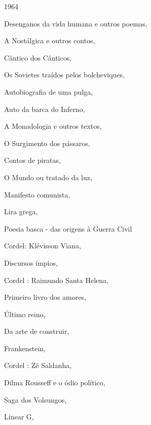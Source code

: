 \begin{multicols}{2}
\begin{enumerate}
{\item 1964
\item Desenganos da vida humana e outros poemas, {}
\item A Nostálgica e outros contos, {}
\item Cântico dos Cânticos, {}
\item Os Sovietes traídos pelos bolcheviques, {}
\item Autobiografia de uma pulga, {}
\item Auto da barca do Inferno, {}
\item A Monadologia e outros textos, {}
\item O Surgimento dos pássaros, {}
\item Contos de piratas, {}
\item O Mundo ou tratado da luz, {}
\item Manifesto comunista, {}
\item Lira grega, {}
\item Poesia basca - das origens à Guerra Civil
\item Cordel: Klévisson Viana, {}
\item Discursos ímpios, {}
\item Cordel : Raimundo Santa Helena, {}
\item Primeiro livro dos amores, {}
\item Último reino, {}
\item Da arte de construir, {}
\item Frankenstein, {}
\item Cordel : Zé Saldanha, {}
\item Dilma Rousseff e o ódio político, {}
\item Saga dos Volsungos, {}
\item Linear G, {}
}
\end{enumerate}
\end{multicols}

